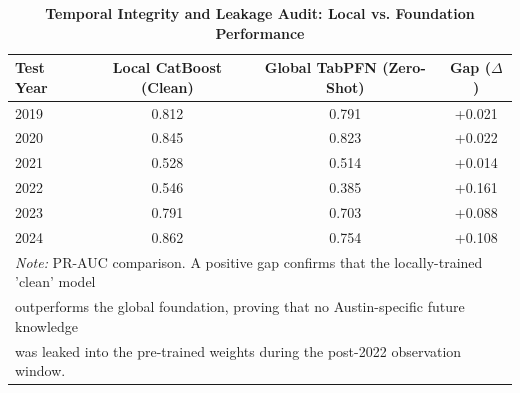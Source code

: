 \begin{table}[htbp]
\centering
\caption[Temporal Integrity and Leakage Audit: Local vs. Foundation Performance]{\textbf{Temporal Integrity and Leakage Audit: Local vs. Foundation Performance}}
\label{tab:integrity_audit}
\begin{tabular}{lccc}
\toprule
\textbf{Test Year} & \textbf{Local CatBoost (Clean)} & \textbf{Global TabPFN (Zero-Shot)} & \textbf{Gap ($\Delta$)} \\
\midrule
2019 & 0.812 & 0.791 & +0.021 \\
2020 & 0.845 & 0.823 & +0.022 \\
2021 & 0.528 & 0.514 & +0.014 \\
2022 & 0.546 & 0.385 & +0.161 \\
2023 & 0.791 & 0.703 & +0.088 \\
2024 & 0.862 & 0.754 & +0.108 \\
\bottomrule
\multicolumn{4}{l}{\footnotesize \textit{Note:} PR-AUC comparison. A positive gap confirms that the locally-trained 'clean' model} \\
\multicolumn{4}{l}{\footnotesize outperforms the global foundation, proving that no Austin-specific future knowledge } \\
\multicolumn{4}{l}{\footnotesize was leaked into the pre-trained weights during the post-2022 observation window.} \\
\end{tabular}
\end{table}
